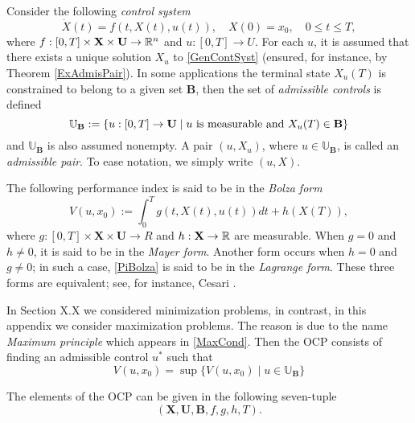   Consider the following {\it control system}
\begin{equation}\label{GenContSyst}
\dot{X}(t)=f(t,X(t),u(t)), \quad X(0)=x_0,\quad 0\leq t\leq T,
\end{equation}
where $f:[0,T]\times \mathbf{X}\times \mathbf{U}\to \mathbb{R}^n$ and $u:[0,T]\to U$. For each $u$, it is assumed that there exists a unique solution $X_u$ to \eqref{GenContSyst} (ensured, for instance, by Theorem \ref{ExAdmisPair}). In some applications the terminal state $X_u(T)$ is constrained to belong to a given set $\mathbf{B}$, then the set of {\it admissible controls} is defined
	\begin{equation}\label{FeasCont}  
		 \mathbb{U}_\mathbf{B}:=\{u:[0,T]\to \mathbf{U}\mid u\  
		 \mbox{\rm is measurable and } X_u(T)\in \mathbf{B}\} 
	\end{equation}
and $\mathbb{U}_\mathbf{B}$	is also assumed nonempty. A pair $(u,X_u)$, where $u\in \mathbb{U}_\mathbf{B}$, is called an 
	{\it admissible pair}. To ease notation, we simply write $(u,X)$.



The following performance index  %
is said to be in the {\it Bolza form}
\begin{equation}\label{PiBolza}
    V(u,x_0):=\int_0^Tg(t,X(t),u(t))dt + h(X(T)),
\end{equation}
where $g:[0,T]\times \mathbf{X}\times \mathbf{U}\to R$ and $h:\mathbf{X}\to \mathbb{R}$ are measurable. When $g= 0$ and $h\neq 0$, it is said to be in the {\it Mayer form}. Another form occurs when $h= 0$ and $g\neq 0$; in such a case, \eqref{PiBolza} is said to be in the {\it Lagrange form}. These three forms are equivalent; see, for instance, Cesari \cite[Sect. 1.9]{Cesari83}. 

In Section X.X we considered minimization problems, in contrast, in this appendix we consider maximization problems. The reason  is due to the name {\it Maximum principle} which appears in \eqref{MaxCond}. Then the OCP consists of finding an admissible control $u^\ast$ such that 
   \[ V(u,x_0) =\sup\{V(u,x_0)\mid u\in  \mathbb{U}_\mathbf{B}\} \]



The elements of the OCP can be given in the following seven-tuple 
   \begin{equation}\label{OCP}
       (\mathbf{X},\mathbf{U},\mathbf{B},f,g,h,T).
   \end{equation}

